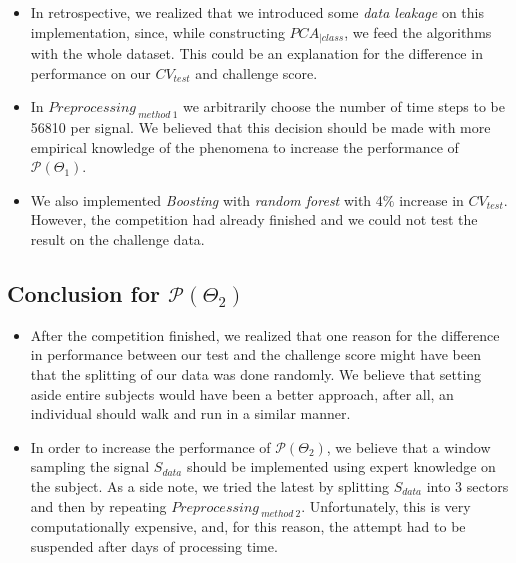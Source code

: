 \begin{itemize}
	\item In retrospective, we realized that we introduced some \emph{data leakage} on this implementation, since, while constructing $PCA_{|class}$, we feed the algorithms with the whole dataset. This could be an explanation for the difference in performance on our $CV_{test}$ and challenge score.
	\item In $Preprocessing_{ \ method \ 1}$  we arbitrarily choose the number of time steps to be 56810 per signal. We believed that this decision should be made with more empirical knowledge of the phenomena to increase the performance of $\mathcal{P}(\Theta_{1})$.
	\item We also implemented \emph{Boosting} with \emph{random forest} with $4\%$ increase in $CV_{test}$. However, the competition had already finished and we could not test the result on the challenge data.
\end{itemize}

\subsection{Conclusion for $\mathcal{P}(\Theta_{2})$}

\begin{itemize}
    \item After the competition finished, we realized that one reason for the difference in performance between our test and the challenge score might have been that the splitting of our data was done randomly. We believe that setting aside entire subjects would have been a better approach, after all, an individual should walk and run in a similar manner.
    \item In order to increase the performance of $\mathcal{P}(\Theta_{2})$, we believe that a window sampling the signal $S_{data}$ should be implemented using expert knowledge on the subject. As a side note, we tried the latest by splitting $S_{data}$ into 3 sectors and then by repeating $Preprocessing_{ \ method \ 2}$. Unfortunately, this is very computationally expensive, and, for this reason, the attempt had to be suspended after days of processing time.

\end{itemize}




